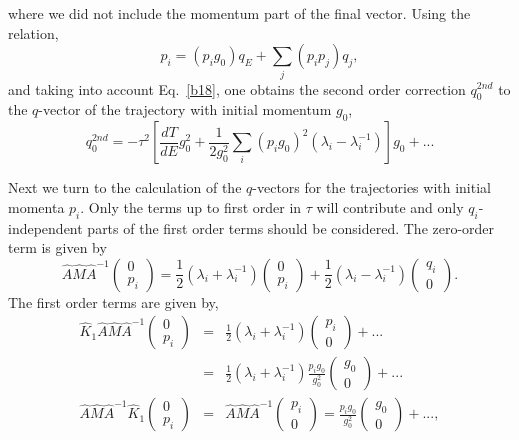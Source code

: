 \documentclass[journal=jpcafh,manuscript=article]{achemso}
\begin{document}
where we did not include the momentum part of the final vector.  Using
the relation,
\begin{equation}
  \label{b23}
  p_i=(p_ig_0)q_E+\sum_j(p_ip_j)q_j,
\end{equation}
and taking into account Eq.~\ref{b18}, one obtains
the second order correction $q^{2nd}_0$ to the $q$-vector of the
trajectory with initial momentum $g_0$,
\begin{equation}
  \label{b28}
  q^{2nd}_0=-\tau^2\left[\frac{dT}{dE}g_0^2+\frac{1}{2g_0^2}\sum_i (p_ig_0)^2
  (\lambda_i-\lambda_i^{-1})\right]g_0+...
\end{equation}

Next we turn to the calculation of the $q$-vectors for the trajectories with
initial momenta $p_i$. Only the terms up to first order in $\tau$ will
contribute and only $q_i$-independent parts of the first order terms
should be considered. The zero-order term is given by
\begin{equation}
  \label{b29}
  \hat{A}\hat{M}\hat{A}^{-1}\left(\begin{array}{c}0\\p_i\end{array}\right)
  =\frac{1}{2}(\lambda_i+\lambda_i^{-1}) \left(\begin{array}{c}0\\p_i\end{array}\right)
  +\frac{1}{2}(\lambda_i-\lambda_i^{-1}) \left(\begin{array}{c}q_i\\0\end{array}\right).
\end{equation}
The first order terms are given by,
\begin{eqnarray}
  \nonumber
  \hat{K}_1\hat{A}\hat{M}\hat{A}^{-1}\left(\begin{array}{c}0\\p_i\end{array}\right)
  &=&\frac{1}{2}(\lambda_i+\lambda_i^{-1})\left(\begin{array}{c}p_i\\0\end{array}\right)+...
  \\
  \label{b31}
  &=&\frac{1}{2}(\lambda_i+\lambda_i^{-1})\frac{p_ig_0}{g_0^2}\left(\begin{array}{c}g_0\\0\end{array}\right)+...
  \\
  \label{b32}
  \hat{A}\hat{M}\hat{A}^{-1}\hat{K}_1\left(\begin{array}{c}0\\p_i\end{array}\right)
  &=&\hat{A}\hat{M}\hat{A}^{-1}\left(\begin{array}{c}p_i\\0\end{array}\right)
 =\frac{p_ig_0}{g_0^2}\left(\begin{array}{c}g_0\\0\end{array}\right)+...,
\end{eqnarray}
\end{document}
